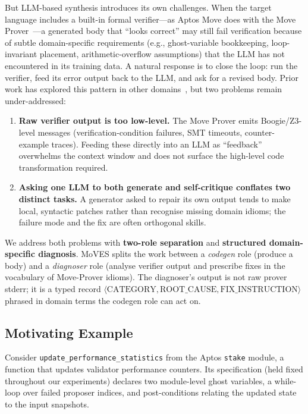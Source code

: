 \documentclass[conference]{IEEEtran}
\begin{document}
But LLM-based synthesis introduces its own challenges. When the target language includes a built-in formal verifier---as Aptos Move does with the Move Prover~\cite{angelis2020move}---a generated body that ``looks correct'' may still fail verification because of subtle domain-specific requirements (e.g., ghost-variable bookkeeping, loop-invariant placement, arithmetic-overflow assumptions) that the LLM has not encountered in its training data. A natural response is to close the loop: run the verifier, feed its error output back to the LLM, and ask for a revised body. Prior work has explored this pattern in other domains~\cite{le2024repair,shinn2023reflexion,yang2024sweagent}, but two problems remain under-addressed:

\begin{enumerate}
\item \textbf{Raw verifier output is too low-level.} The Move Prover emits Boogie/Z3-level messages (verification-condition failures, SMT timeouts, counter-example traces). Feeding these directly into an LLM as ``feedback'' overwhelms the context window and does not surface the high-level code transformation required.
\item \textbf{Asking one LLM to both generate and self-critique conflates two distinct tasks.} A generator asked to repair its own output tends to make local, syntactic patches rather than recognise missing domain idioms; the failure mode and the fix are often orthogonal skills.
\end{enumerate}

We address both problems with \textbf{two-role separation} and \textbf{structured domain-specific diagnosis}. MoVES splits the work between a \textit{codegen} role (produce a body) and a \textit{diagnoser} role (analyse verifier output and prescribe fixes in the vocabulary of Move-Prover idioms). The diagnoser's output is not raw prover stderr; it is a typed record $\langle\text{CATEGORY}, \text{ROOT\_CAUSE}, \text{FIX\_INSTRUCTION}\rangle$ phrased in domain terms the codegen role can act on.

\subsection{Motivating Example}\label{sec:motivating}

Consider \texttt{update\_performance\_statistics} from the Aptos \texttt{stake} module, a function that updates validator performance counters. Its specification (held fixed throughout our experiments) declares two module-level ghost variables, a while-loop over failed proposer indices, and post-conditions relating the updated state to the input snapshots.
\end{document}
